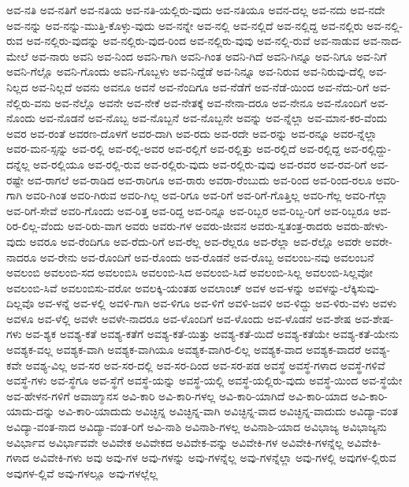 {ಅವ-ನತಿ
ಅವ-ನತಿಗೆ
ಅವ-ನತಿಯ
ಅವ-ನತಿ-ಯಲ್ಲಿರು-ವುದು
ಅವ-ನತಿಯೂ
ಅವನ-ದಲ್ಲ
ಅವ-ನದು
ಅವ-ನದೇ
ಅವ-ನನ್ನು
ಅವ-ನನ್ನು-ಮುತ್ತಿ-ಕೊಳ್ಳು-ವುದು
ಅವ-ನನ್ನೇ
ಅವ-ನಲ್ಲಿ
ಅವ-ನಲ್ಲಿದೆ
ಅವ-ನಲ್ಲಿದ್ದ
ಅವ-ನಲ್ಲಿರು
ಅವ-ನಲ್ಲಿ-ರುವ
ಅವ-ನಲ್ಲಿರು-ವುದನ್ನು
ಅವ-ನಲ್ಲಿರು-ವುದ-ರಿಂದ
ಅವ-ನಲ್ಲಿರು-ವುವು
ಅವ-ನಲ್ಲಿ-ರುವೆ
ಅವ-ನಾಡುವ
ಅವ-ನಾದ-ಮೇಲೆ
ಅವ-ನಾರು
ಅವನಿ
ಅವ-ನಿಂದ
ಅವನಿ-ಗಾಗಿ
ಅವನಿ-ಗಿಂತ
ಅವನಿ-ಗಿದೆ
ಅವನಿ-ಗಿನ್ನೂ
ಅವ-ನಿಗೂ
ಅವ-ನಿಗೆ
ಅವನಿ-ಗೆಲ್ಲೊ
ಅವನಿ-ಗೊಂದು
ಅವನಿ-ಗೊಬ್ಬಳು
ಅವ-ನಿದ್ದೆಡೆ
ಅವ-ನಿನ್ನೂ
ಅವ-ನಿರುವ
ಅವ-ನಿರುವು-ದೆಲ್ಲಿ
ಅವ-ನಿಲ್ಲದ
ಅವ-ನಿಲ್ಲದೆ
ಅವನು
ಅವನೂ
ಅವನೆ
ಅವ-ನೆಂದಿಗೂ
ಅವ-ನೆಡೆಗೆ
ಅವ-ನೆಡೆ-ಯಿಂದ
ಅವ-ನೆದು-ರಿಗೆ
ಅವ-ನೆಲ್ಲಿರು-ವನು
ಅವ-ನೆಲ್ಲೊ
ಅವನೇ
ಅವ-ನೇಕೆ
ಅವ-ನೇತಕ್ಕೆ
ಅವ-ನೇನಾ-ದರೂ
ಅವ-ನೇನೂ
ಅವ-ನೊಂದಿಗೆ
ಅವ-ನೊಂದು
ಅವ-ನೊಡನೆ
ಅವ-ನೊಬ್ಬ
ಅವ-ನೊಬ್ಬನೆ
ಅವ-ನೊಬ್ಬನೇ
ಅವನ್ನು
ಅವ-ನ್ನೆಲ್ಲಾ
ಅವ-ಮಾನ-ಕರ-ವೆಂದು
ಅವರ
ಅವ-ರಂತೆ
ಅವರಣ-ದೊಳಗೆ
ಅವರ-ದಾಗಿ
ಅವ-ರದು
ಅವ-ರದೇ
ಅವ-ರನ್ನು
ಅವ-ರನ್ನೂ
ಅವರ-ನ್ನೆಲ್ಲಾ
ಅವರ-ಮನ-ಸ್ಸನ್ನು
ಅವ-ರಲ್ಲಿ
ಅವ-ರಲ್ಲಿ-ಅವರ
ಅವ-ರಲ್ಲಿಗೆ
ಅವ-ರಲ್ಲಿತ್ತು
ಅವ-ರಲ್ಲಿದೆ
ಅವ-ರಲ್ಲಿದ್ದ
ಅವ-ರಲ್ಲಿದ್ದು-ದನ್ನೆಲ್ಲ
ಅವ-ರಲ್ಲಿಯೂ
ಅವ-ರಲ್ಲಿ-ರುವ
ಅವ-ರಲ್ಲಿರು-ವುದು
ಅವ-ರಲ್ಲಿರು-ವುವು
ಅವ-ರವರ
ಅವ-ರವ-ರಿಗೆ
ಅವ-ರಷ್ಟೇ
ಅವ-ರಾಗಲೆ
ಅವ-ರಾಡಿದ
ಅವ-ರಾರಿಗೂ
ಅವ-ರಾರು
ಅವರಾ-ರೆಂಬುದು
ಅವ-ರಿಂದ
ಅವ-ರಿಂದ-ರಲೂ
ಅವರಿ-ಗಾಗಿ
ಅವರಿ-ಗಿಂತ
ಅವರಿ-ಗಿರುವ
ಅವರಿ-ಗಿಲ್ಲ
ಅವ-ರಿಗೂ
ಅವ-ರಿಗೆ
ಅವ-ರಿಗೆ-ಗೊತ್ತಿಲ್ಲ
ಅವರಿ-ಗೆಲ್ಲ
ಅವರಿ-ಗೆಲ್ಲಾ
ಅವ-ರಿಗೆ-ಸೇವೆ
ಅವರಿ-ಗೊಂದು
ಅವ-ರಿತ್ತ
ಅವ-ರಿದ್ದ
ಅವ-ರಿನ್ನೂ
ಅವ-ರಿಬ್ಬರ
ಅವ-ರಿಬ್ಬ-ರಿಗೆ
ಅವ-ರಿಬ್ಬರೂ
ಅವ-ರಿರ-ಲಿಲ್ಲ-ವೆಂದು
ಅವ-ರಿರು-ವಾಗ
ಅವರು
ಅವರು-ಗಳ
ಅವರು-ಜೀವನ
ಅವರು-ಸ್ವತಂತ್ರ-ರಾದರು
ಅವರು-ಹೇಳು-ವುದು
ಅವರೂ
ಅವ-ರೆಂದಿಗೂ
ಅವ-ರೆದು-ರಿಗೆ
ಅವ-ರೆಲ್ಲ
ಅವ-ರೆಲ್ಲರೂ
ಅವ-ರೆಲ್ಲಾ
ಅವ-ರೆಲ್ಲೊ
ಅವರೇ
ಅವರೇ-ನಾದರೂ
ಅವ-ರೇನು
ಅವ-ರೊಂದಿಗೆ
ಅವ-ರೊಂದು
ಅವ-ರೊಡನೆ
ಅವ-ರೊಬ್ಬ
ಅವಲಂಬ-ನವು
ಅವಲಂಬನೆ
ಅವಲಂಬಿ
ಅವಲಂಬಿ-ಸದ
ಅವಲಂಬಿಸಿ
ಅವಲಂಬಿ-ಸಿದ
ಅವಲಂಬಿ-ಸಿದೆ
ಅವಲಂಬಿ-ಸಿಲ್ಲ
ಅವಲಂಬಿ-ಸಿಲ್ಲವೋ
ಅವಲಂಬಿ-ಸಿವೆ
ಅವಲಂಬಿಸು-ವರೋ
ಅವಲಕ್ಕಿ-ಯಂತಹ
ಅವಲಾಂಚ್
ಅವಳ
ಅವ-ಳನ್ನು
ಅವಳನ್ನು-ಲೆಕ್ಕಿಸುವು-ದಿಲ್ಲವೊ
ಅವ-ಳನ್ನೆ
ಅವ-ಳಲ್ಲಿ
ಅವಳಿ-ಗಾಗಿ
ಅವ-ಳಿಗೂ
ಅವ-ಳಿಗೆ
ಅವಳಿ-ಜವಳಿ
ಅವ-ಳಿದ್ದು
ಅವ-ಳಿರು-ವಳು
ಅವಳು
ಅವಳೂ
ಅವ-ಳೆಲ್ಲಿ
ಅವಳೇ
ಅವಳೇ-ನಾದರೂ
ಅವ-ಳೊಂದಿಗೆ
ಅವ-ಳೊಂದು
ಅವ-ಳೊಡನೆ
ಅವ-ಶೇಷ
ಅವ-ಶೇಷ-ಗಳು
ಅವ-ಶ್ಯಕ
ಅವಶ್ಯ-ಕತೆ
ಅವಶ್ಯ-ಕತೆಗೆ
ಅವಶ್ಯ-ಕತೆ-ಯಿತ್ತು
ಅವಶ್ಯ-ಕತೆ-ಯಿದೆ
ಅವಶ್ಯ-ಕತೆಯೇ
ಅವಶ್ಯ-ಕತೆ-ಯೇನು
ಅವಶ್ಯಕ-ವಲ್ಲ
ಅವಶ್ಯಕ-ವಾಗಿ
ಅವಶ್ಯಕ-ವಾಗಿಯೂ
ಅವಶ್ಯಕ-ವಾಗಿರ-ಲಿಲ್ಲ
ಅವಶ್ಯಕ-ವಾದ
ಅವಶ್ಯಕ-ವಾದರೆ
ಅವಶ್ಯ-ಕವೇ
ಅವಶ್ಯ-ವಿಲ್ಲ
ಅವ-ಸರ
ಅವ-ಸರ-ದಲ್ಲಿ
ಅವ-ಸರ-ದಿಂದ
ಅವ-ಸರ-ಪಡ
ಅವಸ್ಥೆ
ಅವಸ್ಥೆ-ಗಳಾದ
ಅವಸ್ಥೆ-ಗಳಿವೆ
ಅವಸ್ಥೆ-ಗಳು
ಅವ-ಸ್ಥೆಗೂ
ಅವ-ಸ್ಥೆಗೆ
ಅವಸ್ಥೆ-ಯನ್ನು
ಅವಸ್ಥೆ-ಯಲ್ಲಿ
ಅವಸ್ಥೆ-ಯಲ್ಲಿರು-ವುದು
ಅವಸ್ಥೆ-ಯಿಂದ
ಅವ-ಸ್ಥೆಯೇ
ಅವ-ಹೇಳನ-ಗಳಿಗೆ
ಅವಾಙ್ಮಾನಸ
ಅವಿ-ಕಾರಿ
ಅವಿ-ಕಾರಿ-ಗಳಲ್ಲ
ಅವಿ-ಕಾರಿ-ಯಾಗಿದೆ
ಅವಿ-ಕಾರಿ-ಯಾದ
ಅವಿ-ಕಾರಿ-ಯಾದು-ದನ್ನು
ಅವಿ-ಕಾರಿ-ಯಾದುದು
ಅವಿಚ್ಛಿನ್ನ
ಅವಿಚ್ಛಿನ್ನ-ವಾಗಿ
ಅವಿಚ್ಛಿನ್ನ-ವಾದ
ಅವಿಚ್ಛಿನ್ನ-ವಾದುದು
ಅವಿದ್ಯಾ-ವಂತ
ಅವಿದ್ಯಾ-ವಂತ-ನಾದ
ಅವಿದ್ಯಾ-ವಂತ-ರಿಗೆ
ಅವಿ-ನಾಶಿ
ಅವಿನಾಶಿ-ಗಳಲ್ಲ
ಅವಿನಾಶಿ-ಯಾದ
ಅವಿಭಾಜ್ಯ
ಅವಿಭಾಜ್ಯನು
ಅವಿರ್ಭಾವ
ಅವಿರ್ಭಾವವೇ
ಅವಿವೇಕ
ಅವಿವೇಕದ
ಅವಿವೇಕ-ವನ್ನು
ಅವಿವೇಕಿ-ಗಳ
ಅವಿವೇಕಿ-ಗಳನ್ನೆಲ್ಲ
ಅವಿವೇಕಿ-ಗಳಾದ
ಅವಿವೇಕಿ-ಗಳು
ಅವು
ಅವು-ಗಳ
ಅವು-ಗಳನ್ನು
ಅವು-ಗಳನ್ನೆಲ್ಲ
ಅವು-ಗಳನ್ನೆಲ್ಲಾ
ಅವು-ಗಳಲ್ಲಿ
ಅವುಗಳ-ಲ್ಲಿರುವ
ಅವುಗಳ-ಲ್ಲಿವೆ
ಅವು-ಗಳಲ್ಲೂ
ಅವು-ಗಳಲ್ಲೆಲ್ಲ
}
